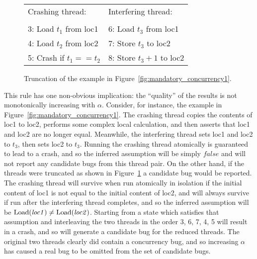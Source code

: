 \begin{figure}
\begin{centering}
\hfill
\begin{tabular}{p{8cm}l}
Crashing thread:          & Interfering thread: \\
\\
3: Load $t_1$ from loc1   & 6: Load $t_3$ from loc1 \\
4: Load $t_2$ from loc2   & 7: Store $t_3$ to loc2 \\
5: Crash if $t_1 == t_2$  & 8: Store $t_3 + 1$ to loc2
\end{tabular}
\hfill
\end{centering}
\caption{Truncation of the example in Figure~\ref{fig:mandatory_concurrency1}.}
\label{fig:mandatory_concurrency2}
\end{figure}


This rule has one non-obvious implication: the ``quality'' of the
results is not monotonically increasing with $\alpha$.  Consider, for
instance, the example in
Figure~\ref{fig:mandatory_concurrency1}.  The crashing thread copies the contents of loc1 to loc2,
performs some complex local calculation, and then asserts that loc1
and loc2 are no longer equal.  Meanwhile, the interfering thread sets
loc1 and loc2 to $t_3$, then sets loc2 to $t_3$.  Running the crashing
thread atomically is guaranteed to lead to a crash, and so the
inferred assumption will be simply $\mathit{false}$ and {\technique}
will not report any candidate bugs from this thread pair.  On the
other hand, if the threads were truncated as shown in
Figure~\ref{fig:mandatory_concurrency2} a candidate bug would be
reported.  The crashing thread will survive when run atomically in
isolation if the initial content of loc1 is not equal to the initial
content of loc2, and will always survive if run after the interfering
thread completes, and so the inferred assumption will be
$\mathrm{Load}(\mathit{loc1}) \not= \mathrm{Load}(\mathit{loc2})$.  Starting from
a state which satisfies that assumption and interleaving the two
threads in the order 3, 6, 7, 4, 5 will result in
a crash, and so {\technique} will generate a candidate bug for the
reduced threads.  The original two threads clearly did contain a
concurrency bug, and so increasing $\alpha$ has caused a real bug to
be omitted from the set of candidate bugs.

